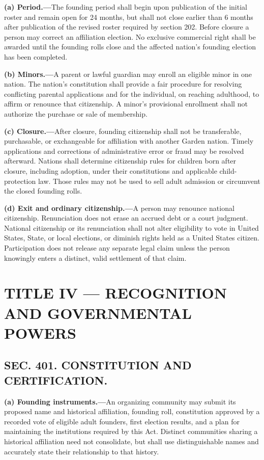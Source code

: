 \documentclass[12pt,letterpaper]{article}
\begin{document}
\textbf{(a) Period.---}The founding period shall begin upon publication of the initial roster and remain open for 24 months, but shall not close earlier than 6 months after publication of the revised roster required by section 202. Before closure a person may correct an affiliation election. No exclusive commercial right shall be awarded until the founding rolls close and the affected nation's founding election has been completed.

\textbf{(b) Minors.---}A parent or lawful guardian may enroll an eligible minor in one nation. The nation's constitution shall provide a fair procedure for resolving conflicting parental applications and for the individual, on reaching adulthood, to affirm or renounce that citizenship. A minor's provisional enrollment shall not authorize the purchase or sale of membership.

\textbf{(c) Closure.---}After closure, founding citizenship shall not be transferable, purchasable, or exchangeable for affiliation with another Garden nation. Timely applications and corrections of administrative error or fraud may be resolved afterward. Nations shall determine citizenship rules for children born after closure, including adoption, under their constitutions and applicable child-protection law. Those rules may not be used to sell adult admission or circumvent the closed founding rolls.

\textbf{(d) Exit and ordinary citizenship.---}A person may renounce national citizenship. Renunciation does not erase an accrued debt or a court judgment. National citizenship or its renunciation shall not alter eligibility to vote in United States, State, or local elections, or diminish rights held as a United States citizen. Participation does not release any separate legal claim unless the person knowingly enters a distinct, valid settlement of that claim.

\section*{TITLE IV --- RECOGNITION AND GOVERNMENTAL POWERS}

\subsection*{SEC. 401. CONSTITUTION AND CERTIFICATION.}

\textbf{(a) Founding instruments.---}An organizing community may submit its proposed name and historical affiliation, founding roll, constitution approved by a recorded vote of eligible adult founders, first election results, and a plan for maintaining the institutions required by this Act. Distinct communities sharing a historical affiliation need not consolidate, but shall use distinguishable names and accurately state their relationship to that history.
\end{document}
